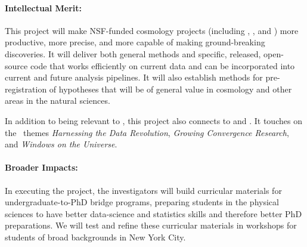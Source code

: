 \documentclass[12pt, fullpage, letterpaper]{article}
\begin{document}
\paragraph{Intellectual Merit:}
This project will make NSF-funded cosmology projects (including
\SDSSIV, \DESI, and \LSST) more productive, more precise, and more
capable of making ground-breaking discoveries.
It will deliver both general methods and specific, released,
open-source code that works efficiently on current data and can be
incorporated into current and future analysis pipelines.
It will also establish methods for pre-registration of hypotheses that
will be of general value in cosmology and other areas in the natural
sciences.

In addition to being relevant to , this project also
connects to  and . It touches on the \NSF\ themes
\textsl{Harnessing the Data Revolution},
\textsl{Growing Convergence Research}, and
\textsl{Windows on the Universe}.

\paragraph{Broader Impacts:}
In executing the project, the investigators will build curricular
materials for undergraduate-to-PhD bridge programs, preparing students
in the physical sciences to have better data-science and statistics
skills and therefore better PhD preparations.
We will test and refine these curricular materials in workshops for
students of broad backgrounds in New York City.
\end{document}
